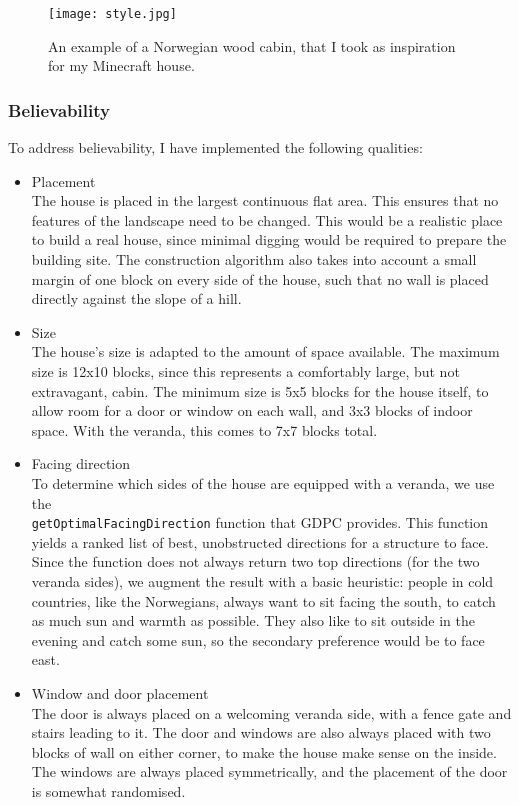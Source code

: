 \documentclass[10pt]{article}
\begin{document}
\begin{figure}
    \texttt{[image: style.jpg]}
    \centering
    \caption{An example of a Norwegian wood cabin, that I took as inspiration for my Minecraft house.}
    \label{fig:style}
\end{figure}

\subsubsection{Believability}
To address believability, I have implemented the following qualities:
\begin{itemize}
    \item Placement\\
          The house is placed in the largest continuous flat area. This ensures that no features of the landscape need to be changed. This would be a realistic place to build a real house, since minimal digging would be required to prepare the building site. The construction algorithm also takes into account a small margin of one block on every side of the house, such that no wall is placed directly against the slope of a hill.
    \item Size\\
          The house's size is adapted to the amount of space available. The maximum size is 12x10 blocks, since this represents a comfortably large, but not extravagant, cabin. The minimum size is 5x5 blocks for the house itself, to allow room for a door or window on each wall, and 3x3 blocks of indoor space. With the veranda, this comes to 7x7 blocks total.
    \item Facing direction\\
          To determine which sides of the house are equipped with a veranda, we use the\\ \texttt{getOptimalFacingDirection} function that GDPC provides. This function yields a ranked list of best, unobstructed directions for a structure to face. Since the function does not always return two top directions (for the two veranda sides), we augment the result with a basic heuristic: people in cold countries, like the Norwegians, always want to sit facing the south, to catch as much sun and warmth as possible. They also like to sit outside in the evening and catch some sun, so the secondary preference would be to face east.
    \item Window and door placement\\
          The door is always placed on a welcoming veranda side, with a fence gate and stairs leading to it. The door and windows are also always placed with two blocks of wall on either corner, to make the house make sense on the inside. The windows are always placed symmetrically, and the placement of the door is somewhat randomised.
\end{itemize}
\end{document}
